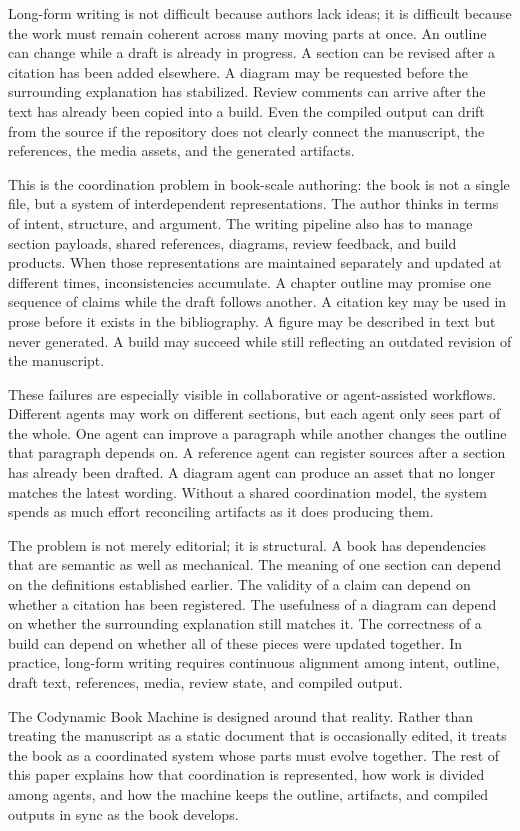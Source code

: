 Long-form writing is not difficult because authors lack ideas; it is difficult because the work must remain coherent across many moving parts at once. An outline can change while a draft is already in progress. A section can be revised after a citation has been added elsewhere. A diagram may be requested before the surrounding explanation has stabilized. Review comments can arrive after the text has already been copied into a build. Even the compiled output can drift from the source if the repository does not clearly connect the manuscript, the references, the media assets, and the generated artifacts.

This is the coordination problem in book-scale authoring: the book is not a single file, but a system of interdependent representations. The author thinks in terms of intent, structure, and argument. The writing pipeline also has to manage section payloads, shared references, diagrams, review feedback, and build products. When those representations are maintained separately and updated at different times, inconsistencies accumulate. A chapter outline may promise one sequence of claims while the draft follows another. A citation key may be used in prose before it exists in the bibliography. A figure may be described in text but never generated. A build may succeed while still reflecting an outdated revision of the manuscript.

These failures are especially visible in collaborative or agent-assisted workflows. Different agents may work on different sections, but each agent only sees part of the whole. One agent can improve a paragraph while another changes the outline that paragraph depends on. A reference agent can register sources after a section has already been drafted. A diagram agent can produce an asset that no longer matches the latest wording. Without a shared coordination model, the system spends as much effort reconciling artifacts as it does producing them.

The problem is not merely editorial; it is structural. A book has dependencies that are semantic as well as mechanical. The meaning of one section can depend on the definitions established earlier. The validity of a claim can depend on whether a citation has been registered. The usefulness of a diagram can depend on whether the surrounding explanation still matches it. The correctness of a build can depend on whether all of these pieces were updated together. In practice, long-form writing requires continuous alignment among intent, outline, draft text, references, media, review state, and compiled output.

The Codynamic Book Machine is designed around that reality. Rather than treating the manuscript as a static document that is occasionally edited, it treats the book as a coordinated system whose parts must evolve together. The rest of this paper explains how that coordination is represented, how work is divided among agents, and how the machine keeps the outline, artifacts, and compiled outputs in sync as the book develops.
